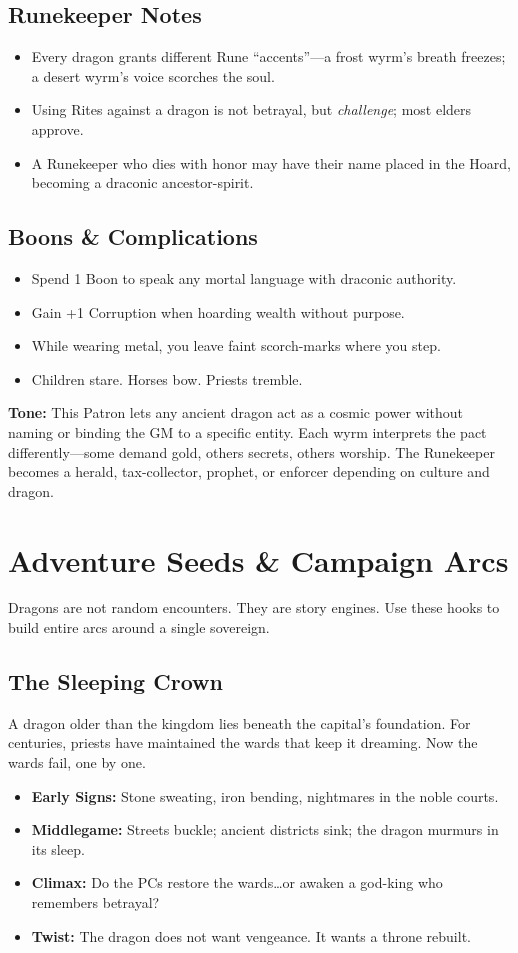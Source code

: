 \documentclass[11pt,letterpaper]{article}
\newcommand{\sectionheader}[1]{\section*{#1}}
\newcommand{\subsectionheader}[1]{\subsection*{#1}}
\begin{document}
\subsection*{Runekeeper Notes}
\begin{itemize}[leftmargin=*]
\item Every dragon grants different Rune ``accents''---a frost wyrm's breath freezes; a desert wyrm's voice scorches the soul.
\item Using Rites against a dragon is not betrayal, but \emph{challenge}; most elders approve.
\item A Runekeeper who dies with honor may have their name placed in the Hoard, becoming a draconic ancestor-spirit.
\end{itemize}

\subsection*{Boons \& Complications}
\begin{itemize}[leftmargin=*]
\item Spend 1 Boon to speak any mortal language with draconic authority.
\item Gain +1 Corruption when hoarding wealth without purpose.
\item While wearing metal, you leave faint scorch-marks where you step.
\item Children stare. Horses bow. Priests tremble.
\end{itemize}

\medskip
\noindent
\textbf{Tone:} This Patron lets any ancient dragon act as a cosmic power without naming or binding the GM to a specific entity. Each wyrm interprets the pact differently---some demand gold, others secrets, others worship. The Runekeeper becomes a herald, tax-collector, prophet, or enforcer depending on culture and dragon.


\sectionheader{Adventure Seeds \& Campaign Arcs}

Dragons are not random encounters. They are story engines.
Use these hooks to build entire arcs around a single sovereign.

\subsectionheader{The Sleeping Crown}
A dragon older than the kingdom lies beneath the capital's foundation.
For centuries, priests have maintained the wards that keep it dreaming.
Now the wards fail, one by one.
\begin{itemize}[leftmargin=*]
\item \textbf{Early Signs:} Stone sweating, iron bending, nightmares in the noble courts.
\item \textbf{Middlegame:} Streets buckle; ancient districts sink; the dragon murmurs in its sleep.
\item \textbf{Climax:} Do the PCs restore the wards\dots or awaken a god-king who remembers betrayal?
\item \textbf{Twist:} The dragon does not want vengeance. It wants a throne rebuilt.
\end{itemize}
\end{document}
